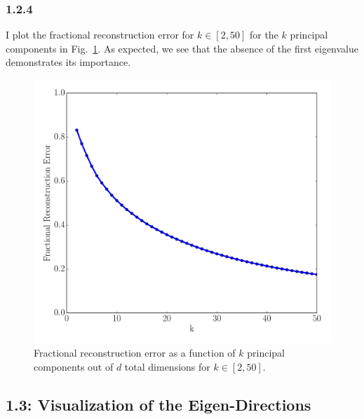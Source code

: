 \documentclass[12pt]{amsart}
\begin{document}
\subsubsection*{1.2.4}
I plot the fractional reconstruction error for $k \in [2,50]$ for the $k$ principal components in Fig.~\ref{fig:frac_rec_error_sans_mean}.  As expected, we see that the absence of the first eigenvalue demonstrates its importance.
\begin{figure}[H]
	\includegraphics[width=\columnwidth]{fractional_rec_error_sans_mean.pdf}
    \caption{Fractional reconstruction error as a function of $k$ principal components out of $d$ total dimensions for $k \in [2,50]$.}
    \label{fig:frac_rec_error_sans_mean}
\end{figure}

\subsection*{1.3: Visualization of the Eigen-Directions}
\end{document}
